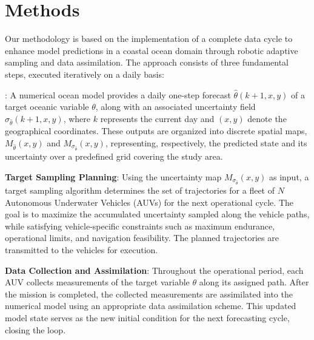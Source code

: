 \section{Methods}

Our methodology is based on the implementation of a complete data cycle
to enhance model predictions in a coastal ocean domain through robotic
adaptive sampling and data assimilation. The approach consists of three
fundamental steps, executed iteratively on a daily basis:

\begin{description}
    \item[Model Forecast and Uncertainty Projection]:  
      A numerical ocean model provides a daily one-step forecast
      $\hat{\theta}(k+1, x, y)$ of a target oceanic variable $\theta$,
      along with an associated uncertainty field
      $\sigma_{\hat{\theta}}(k+1, x, y)$, where $k$ represents the
      current day and $(x, y)$ denote the geographical coordinates.
      These outputs are organized into discrete spatial maps,
      $M_{\hat{\theta}}(x, y)$ and $M_{\sigma_{\hat{\theta}}}(x, y)$,
      representing, respectively, the predicted state and its
      uncertainty over a predefined grid covering the study area.
    
    \item \textbf{Target Sampling Planning}:  
      Using the uncertainty map $M_{\sigma_{\hat{\theta}}}(x, y)$ as
      input, a target sampling algorithm determines the set of
      trajectories for a fleet of $N$ Autonomous Underwater Vehicles
      (AUVs) for the next operational cycle. The goal is to maximize the
      accumulated uncertainty sampled along the vehicle paths, while
      satisfying vehicle-specific constraints such as maximum endurance,
      operational limits, and navigation feasibility. The planned
      trajectories are transmitted to the vehicles for execution.

    \item \textbf{Data Collection and Assimilation}:  
      Throughout the operational period, each AUV collects
      measurements of the target variable $\theta$ along its assigned
      path. After the mission is completed, the collected measurements
      are assimilated into the numerical model using an appropriate data
      assimilation scheme. This updated model state serves as the new
      initial condition for the next forecasting cycle, closing the
      loop.

\end{description}

